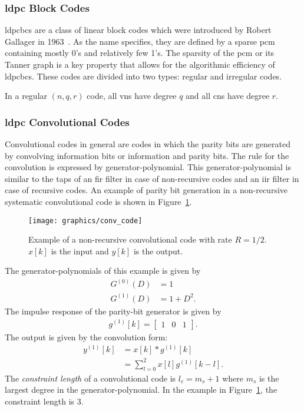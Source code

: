 \subsubsection{\acl{ldpc} Block Codes}
\acp{ldpcbc} are a class of linear block codes which were introduced by Robert Gallager in 1963~\cite{Gallager1963}. As the name specifies, they are defined by a sparse \ac{pcm} containing mostly 0's and relatively few 1's. The sparsity of the \ac{pcm} or its Tanner graph is a key property that allows for the algorithmic efficiency of \acp{ldpcbc}. These codes are divided into two types: regular and irregular codes.

In a regular $(n,q,r)$ code, all \acp{vn} have degree $q$ and all \acp{cn} have degree $r$.

\subsubsection{\acl{ldpc} Convolutional Codes}
Convolutional codes in general are codes in which the parity bits are generated by convolving information bits or information and parity bits. The rule for the convolution is expressed by generator-polynomial. This generator-polynomial is similar to the taps of an \ac{fir} filter in case of non-recursive codes and an \ac{iir} filter in case of recursive codes. An example of parity bit generation in a non-recursive systematic convolutional code is shown in Figure~\ref{fig:conv_code}.
\begin{figure}[htbp]
  \centering
  \texttt{[image: graphics/conv\_code]}
  \caption{Example of a non-recursive convolutional code with rate $R=1/2$. $x[k]$ is the input and $y[k]$ is the output.}
  \label{fig:conv_code}
\end{figure}
The generator-polynomials of this example is given by
\begin{align}
G^{(0)}(D)&=1\\
G^{(1)}(D)&=1+D^2.
\end{align}
The impulse response of the parity-bit generator is given by
\begin{align}g^{(1)}[k]=\begin{bmatrix}
1 &0 &1
\end{bmatrix}.\end{align}
The output is given by the convolution form:
\begin{align}
y^{(1)}[k]&=x[k]*g^{(1)}[k]\nonumber\\
&=\sum_{l=0}^{2}x[l]g^{(1)}[k-l].
\end{align}
The \emph{constraint length} of a convolutional code is $l_c=m_s+1$ where $m_s$ is the largest degree in the generator-polynomial. In the example in Figure~\ref{fig:conv_code}, the constraint length is 3.

